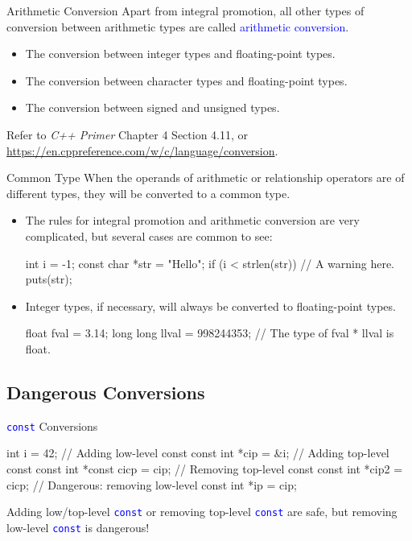\documentclass{beamer}
\newcommand{\blue}[1]{\textcolor{blue}{#1}}
\newcommand{\ttt}[1]{\texttt{#1}}
\newcommand{\bluett}[1]{\blue{\ttt{#1}}}
\theoremstyle{definition}
\begin{document}
\begin{frame}{Arithmetic Conversion}
    Apart from integral promotion, all other types of conversion between arithmetic types are called \blue{arithmetic conversion}.
    \begin{itemize}
        \item The conversion between integer types and floating-point types.
        \item The conversion between character types and floating-point types.
        \item The conversion between signed and unsigned types.
    \end{itemize}
    Refer to \textit{C++ Primer} Chapter 4 Section 4.11, or \url{https://en.cppreference.com/w/c/language/conversion}.
\end{frame}

\begin{frame}[fragile]{Common Type}
    When the operands of arithmetic or relationship operators are of different types, they will be converted to a common type.
    \pause
    \begin{itemize}
        \item The rules for integral promotion and arithmetic conversion are very complicated, but several cases are common to see:
        \begin{cpp}
int i = -1;
const char *str = "Hello";
if (i < strlen(str)) // A warning here.
  puts(str);
        \end{cpp}
        \pause
        \item Integer types, if necessary, will always be converted to floating-point types.
        \begin{cpp}
float fval = 3.14;
long long llval = 998244353;
// The type of fval * llval is float.
        \end{cpp}
    \end{itemize}
\end{frame}

\subsection{Dangerous Conversions}

\begin{frame}[fragile]{\bluett{const} Conversions}
    \begin{cpp}
int i = 42;
// Adding low-level const
const int *cip = &i;
// Adding top-level const
const int *const cicp = cip;
// Removing top-level const
const int *cip2 = cicp;
// Dangerous: removing low-level const
int *ip = cip;
    \end{cpp}
    \pause
    Adding low/top-level \bluett{const} or removing top-level \bluett{const} are safe, but removing low-level \bluett{const} is dangerous!
\end{frame}
\end{document}
